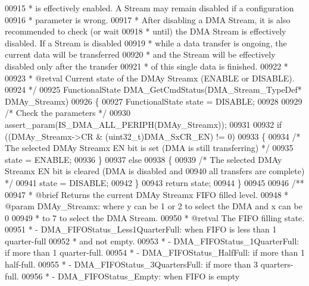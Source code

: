 \begin{DoxyCode}
00915 \textcolor{comment}{  *          is effectively enabled. A Stream may remain disabled if a configuration}
00916 \textcolor{comment}{  *          parameter is wrong.}
00917 \textcolor{comment}{  *          After disabling a DMA Stream, it is also recommended to check (or wait }
00918 \textcolor{comment}{  *          until) the DMA Stream is effectively disabled. If a Stream is disabled}
00919 \textcolor{comment}{  *          while a data transfer is ongoing, the current data will be transferred}
00920 \textcolor{comment}{  *          and the Stream will be effectively disabled only after the transfer}
00921 \textcolor{comment}{  *          of this single data is finished.  }
00922 \textcolor{comment}{  *      }
00923 \textcolor{comment}{  * @retval Current state of the DMAy Streamx (ENABLE or DISABLE).}
00924 \textcolor{comment}{  */}
00925 FunctionalState DMA_GetCmdStatus(DMA\_Stream\_TypeDef* DMAy\_Streamx)
00926 \{
00927   FunctionalState state = DISABLE;
00928 
00929   \textcolor{comment}{/* Check the parameters */}
00930   assert_param(IS\_DMA\_ALL\_PERIPH(DMAy\_Streamx));
00931 
00932   \textcolor{keywordflow}{if} ((DMAy\_Streamx->CR & (uint32\_t)DMA_SxCR_EN) != 0)
00933   \{
00934     \textcolor{comment}{/* The selected DMAy Streamx EN bit is set (DMA is still transferring) */}
00935     state = ENABLE;
00936   \}
00937   \textcolor{keywordflow}{else}
00938   \{
00939     \textcolor{comment}{/* The selected DMAy Streamx EN bit is cleared (DMA is disabled and }
00940 \textcolor{comment}{        all transfers are complete) */}
00941     state = DISABLE;
00942   \}
00943   \textcolor{keywordflow}{return} state;
00944 \}
00945 
00946 \textcolor{comment}{/**}
00947 \textcolor{comment}{  * @brief  Returns the current DMAy Streamx FIFO filled level.}
00948 \textcolor{comment}{  * @param  DMAy\_Streamx: where y can be 1 or 2 to select the DMA and x can be 0 }
00949 \textcolor{comment}{  *         to 7 to select the DMA Stream.}
00950 \textcolor{comment}{  * @retval The FIFO filling state.}
00951 \textcolor{comment}{  *           - DMA\_FIFOStatus\_Less1QuarterFull: when FIFO is less than 1 quarter-full }
00952 \textcolor{comment}{  *                                               and not empty.}
00953 \textcolor{comment}{  *           - DMA\_FIFOStatus\_1QuarterFull: if more than 1 quarter-full.}
00954 \textcolor{comment}{  *           - DMA\_FIFOStatus\_HalfFull: if more than 1 half-full.}
00955 \textcolor{comment}{  *           - DMA\_FIFOStatus\_3QuartersFull: if more than 3 quarters-full.}
00956 \textcolor{comment}{  *           - DMA\_FIFOStatus\_Empty: when FIFO is empty}

\end{DoxyCode}
